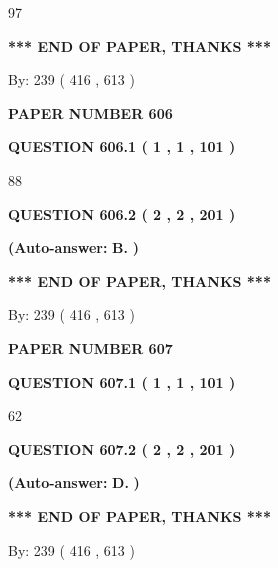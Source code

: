 \documentclass{ctexart}
\begin{document}
97
   
   
   
   
\vspace{1.0in} 
{\textbf{\large{ *** END OF PAPER, THANKS *** }}} 
   
   
\hspace{1.0in} By: 
 239 ( 416 ,  613 )
   
   
   
   
\newpage 
\setcounter{page}{ 
   606001 } 
   
   
 {\textbf{ \Large{ PAPER NUMBER  606  }}}
   
   
   
   
  
  
{\textbf{\large{QUESTION
606.1 
 ( 1 , 1 , 101 )
}}}

88
  
  
{\textbf{\large{QUESTION
606.2 
 ( 2 , 2 , 201 )
}}}
 
 
{\textbf{(Auto-answer:}}
{\textbf{\large{
B.}}}
{\textbf{)}}
 
 
   
   
   
   
\vspace{1.0in} 
{\textbf{\large{ *** END OF PAPER, THANKS *** }}} 
   
   
\hspace{1.0in} By: 
 239 ( 416 ,  613 )
   
   
   
   
\newpage 
\setcounter{page}{ 
   607001 } 
   
   
 {\textbf{ \Large{ PAPER NUMBER  607  }}}
   
   
   
   
  
  
{\textbf{\large{QUESTION
607.1 
 ( 1 , 1 , 101 )
}}}

62
  
  
{\textbf{\large{QUESTION
607.2 
 ( 2 , 2 , 201 )
}}}
 
 
{\textbf{(Auto-answer:}}
{\textbf{\large{
D.}}}
{\textbf{)}}
 
 
   
   
   
   
\vspace{1.0in} 
{\textbf{\large{ *** END OF PAPER, THANKS *** }}} 
   
   
\hspace{1.0in} By: 
 239 ( 416 ,  613 )
   
   
   
   
\newpage 
\setcounter{page}{ 
   608001 } 
   
\end{document}

